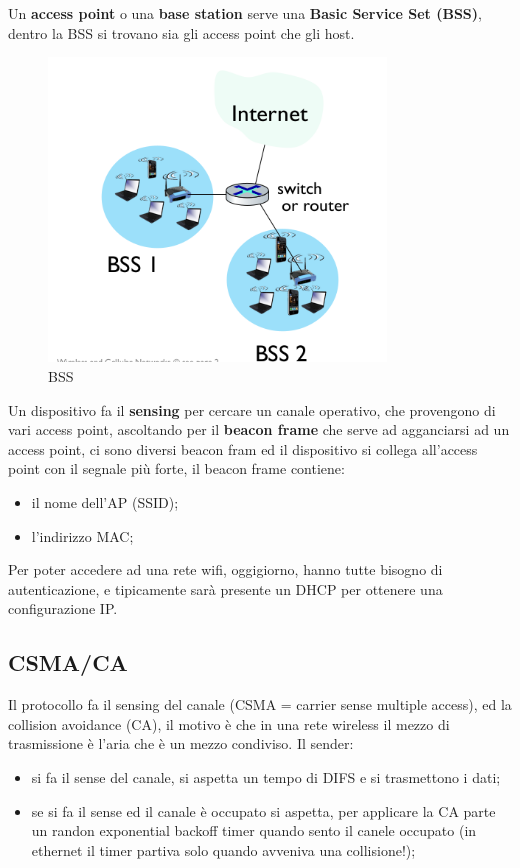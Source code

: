 \documentclass[12pt]{article}
\begin{document}
Un \textbf{access point} o una \textbf{base station} serve una \textbf{Basic Service Set (BSS)}, dentro la BSS si trovano sia gli access point che gli host.
\begin{figure}[H]
    \centering
    \includegraphics[width=0.8\textwidth]{bss.png}
    \caption{BSS}
    \label{fig:bss}
\end{figure}

Un dispositivo fa il \textbf{sensing} per cercare un canale operativo, che provengono di vari access point, ascoltando per il \textbf{beacon frame} che serve ad agganciarsi ad un access point, ci sono diversi beacon fram ed il dispositivo si collega all'access point con il segnale pi\`u forte, il beacon frame contiene:
\begin{itemize}
    \item il nome dell'AP (SSID);
    \item l'indirizzo MAC;
\end{itemize}
Per poter accedere ad una rete wifi, oggigiorno, hanno tutte bisogno di autenticazione, e tipicamente sar\`a presente un DHCP per ottenere una configurazione IP.

\subsection{CSMA/CA}
Il protocollo fa il sensing del canale (CSMA = carrier sense multiple access), ed la collision avoidance (CA), il motivo \`e che in una rete wireless il mezzo di trasmissione \`e l'aria che \`e un mezzo condiviso. 
Il sender:
\begin{itemize}
    \item si fa il sense del canale, si aspetta un tempo di DIFS e si trasmettono i dati;
    \item se si fa il sense ed il canale \`e occupato si aspetta, per applicare la CA parte un randon exponential backoff timer quando sento il canele occupato (in ethernet il timer partiva solo quando avveniva una collisione!);
\end{itemize}
\end{document}
